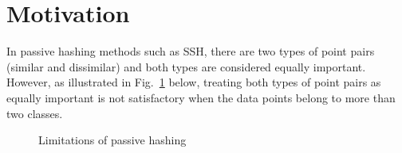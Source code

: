 %
\section{Motivation}
\label{AH:motivation}

In passive hashing methods such as \mbox{SSH}, there are two types of point pairs (similar and dissimilar) and both types are considered equally important. However, as illustrated in Fig.~\ref{fig:bias} below, treating both types of point pairs as equally important is not satisfactory when the data points belong to more than two classes.

\begin{figure}[htb]
\centering
{}
\caption{Limitations of passive hashing}
\label{fig:bias}
\end{figure}

